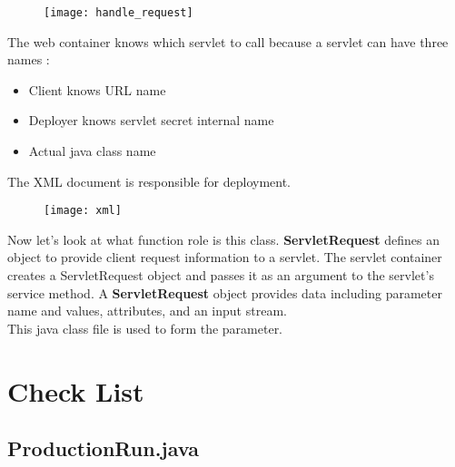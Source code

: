 \documentclass{article}
\begin{document}
\begin{figure}[h]
\centering
\texttt{[image: handle\_request]}
\end{figure}
\newpage
The web container knows which servlet to call because a servlet can have three names :
\begin{itemize}
	\item Client knows URL name
	\item Deployer knows servlet secret internal name
	\item Actual java class name
\end{itemize}
 The XML document is responsible for deployment.
 \begin{figure}[h]
 	\centering
 	\texttt{[image: xml]}
 \end{figure}
\newpage
Now let's look at what function role is this class. \textbf{ServletRequest} defines an object to provide client request information to a servlet. The servlet container creates a ServletRequest object and passes it as an argument to the servlet's service method. A \textbf{ServletRequest} object provides data including parameter name and values, attributes, and an input stream.\\
This java class file is used to form the parameter.
\section{Check List}
 \subsection{ProductionRun.java}
\end{document}
